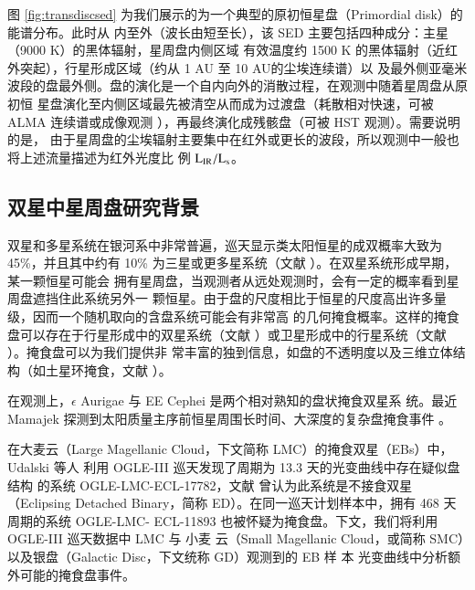 

图 \ref{fig:transdiscsed} 为我们展示的为一个典型的原初恒星盘（Primordial disk）的能谱分布。此时从
内至外（波长由短至长），该 SED 主要包括四种成分：主星（9000 K）的黑体辐射，星周盘内侧区域
有效温度约 1500 K 的黑体辐射（近红外突起），行星形成区域（约从 1 AU 至 10 AU的尘埃连续谱）以
及最外侧亚毫米波段的盘最外侧。盘的演化是一个自内向外的消散过程，在观测中随着星周盘从原初恒
星盘演化至内侧区域最先被清空从而成为过渡盘（耗散相对快速，可被 ALMA 连续谱或成像观测
\cite{WilliamsCieza2011}），再最终演化成残骸盘（可被 HST 观测\cite{Wyatt2008}）。需要说明的是，
由于星周盘的尘埃辐射主要集中在红外或更长的波段，所以观测中一般也将上述流量描述为红外光度比
例 $\mathrm{L}_\mathrm{IR}/\mathrm{L}_\mathrm{s}$。


\subsection{双星中星周盘研究背景} \label{sec:diskintro}

双星和多星系统在银河系中非常普遍，巡天显示类太阳恒星的成双概率大致为 45\%，并且其中约有 
10\% 为三星或更多星系统（文献 ）。在双星系统形成早期，某一颗恒星可能会
拥有星周盘\cite{Bate1995}，当观测者从远处观测时，会有一定的概率看到星周盘遮挡住此系统另外一
颗恒星。由于盘的尺度相比于恒星的尺度高出许多量级，因而一个随机取向的含盘系统可能会有非常高
的几何掩食概率\cite{Mamajek2012}。这样的掩食盘可以存在于行星形成中的双星系统（文献 
）或卫星形成中的行星系统（文献 ）。掩食盘可以为我们提供非
常丰富的独到信息，如盘的不透明度以及三维立体结构（如土星环掩食，文献 ）。

在观测上，$\epsilon$ Aurigae\cite{Guinan2002,Kloppenborg2010,Chadima2011} 与 EE Cephei 
\cite{Mikolajewski1999,Graczyk2003,Mikolajewski2005,Galan2012} 是两个相对熟知的盘状掩食双星系
统。最近 Mamajek 探测到太阳质量主序前恒星周围长时间、大深度的复杂盘掩食事件
\cite{Mamajek2012}。

在大麦云（Large Magellanic Cloud，下文简称 LMC）的掩食双星（EBs）中，Udalski 等人
\cite{Udalski2008,Graczyk2011}利用 OGLE-III 巡天发现了周期为 13.3 天的光变曲线中存在疑似盘结构
的系统 OGLE-LMC-ECL-17782，文献  曾认为此系统是不接食双星（Eclipsing 
Detached Binary，简称 ED）。在同一巡天计划样本中，拥有 468 天周期的系统 OGLE-LMC- 
ECL-11893 也被怀疑为掩食盘\cite{Dong2014}。下文，我们将利用 OGLE-III 巡天数据中 LMC 与 小麦
云（Small Magellanic Cloud，或简称 SMC）以及银盘（Galactic Disc，下文统称 GD）观测到的 EB 样
本\cite{Graczyk2011,Pawlak2013,Pietrukowicz2013} 光变曲线中分析额外可能的掩食盘事件。

